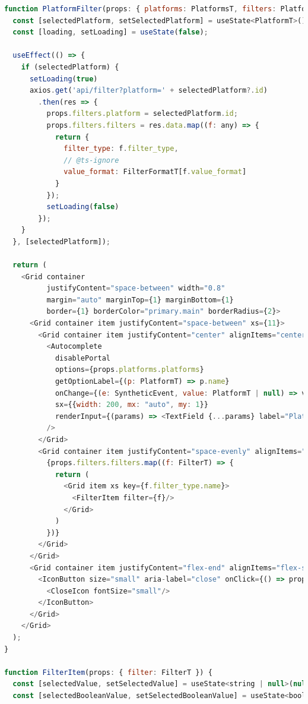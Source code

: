 \documentclass{article}
\begin{document}
\begin{lstlisting}[language=JavaScript, caption=src.components.filter.filter]
function PlatformFilter(props: { platforms: PlatformsT, filters: PlatformsFilterT, removeFilter: (orFilter: PlatformsFilterT) => void }) {
  const [selectedPlatform, setSelectedPlatform] = useState<PlatformT>();
  const [loading, setLoading] = useState(false);

  useEffect(() => {
    if (selectedPlatform) {
      setLoading(true)
      axios.get('api/filter?platform=' + selectedPlatform?.id)
        .then(res => {
          props.filters.platform = selectedPlatform.id;
          props.filters.filters = res.data.map((f: any) => {
            return {
              filter_type: f.filter_type,
              // @ts-ignore
              value_format: FilterFormatT[f.value_format]
            }
          });
          setLoading(false)
        });
    }
  }, [selectedPlatform]);

  return (
    <Grid container
          justifyContent="space-between" width="0.8"
          margin="auto" marginTop={1} marginBottom={1}
          border={1} borderColor="primary.main" borderRadius={2}>
      <Grid container item justifyContent="space-between" xs={11}>
        <Grid container item justifyContent="center" alignItems="center" xs="auto" mx="auto">
          <Autocomplete
            disablePortal
            options={props.platforms.platforms}
            getOptionLabel={(p: PlatformT) => p.name}
            onChange={(e: SyntheticEvent, value: PlatformT | null) => value != null ? setSelectedPlatform(value) : null}
            sx={{width: 200, mx: "auto", my: 1}}
            renderInput={(params) => <TextField {...params} label="Platform" variant="standard"/>}
          />
        </Grid>
        <Grid container item justifyContent="space-evenly" alignItems="center" columnSpacing={2} xs={9}>
          {props.filters.filters.map((f: FilterT) => {
            return (
              <Grid item xs key={f.filter_type.name}>
                <FilterItem filter={f}/>
              </Grid>
            )
          })}
        </Grid>
      </Grid>
      <Grid container item justifyContent="flex-end" alignItems="flex-start" xs={1}>
        <IconButton size="small" aria-label="close" onClick={() => props.removeFilter(props.filters)}>
          <CloseIcon fontSize="small"/>
        </IconButton>
      </Grid>
    </Grid>
  );
}

function FilterItem(props: { filter: FilterT }) {
  const [selectedValue, setSelectedValue] = useState<string | null>(null);
  const [selectedBooleanValue, setSelectedBooleanValue] = useState<boolean>(false);


\end{lstlisting}
\end{document}
